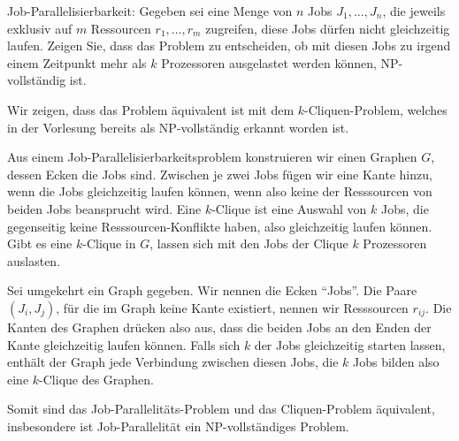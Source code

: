 Job-Parallelisierbarkeit:
Gegeben sei eine Menge von $n$ Jobs $J_1,\dots,J_n$, die jeweils exklusiv
auf $m$ Ressourcen $r_1,\dots,r_m$ zugreifen, diese Jobs dürfen
nicht gleichzeitig laufen. Zeigen Sie, dass das Problem zu entscheiden,
ob mit diesen Jobs zu irgend einem Zeitpunkt mehr als $k$ Prozessoren
ausgelastet werden können, NP-vollständig ist.


\begin{loesung}
Wir zeigen, dass das Problem äquivalent ist mit dem $k$-Cliquen-Problem,
welches in der Vorlesung bereits als NP-vollständig erkannt worden ist.

Aus einem Job-Parallelisierbarkeitsproblem konstruieren wir einen Graphen $G$,
dessen Ecken die Jobs sind. Zwischen je zwei Jobs fügen wir eine
Kante hinzu, wenn die Jobs gleichzeitig laufen können, wenn also
keine der Resssourcen von beiden Jobs beansprucht wird. Eine $k$-Clique
ist eine Auswahl von $k$ Jobs, die gegenseitig keine Resssourcen-Konflikte
haben, also gleichzeitig laufen können. Gibt es eine $k$-Clique in $G$,
lassen sich mit den Jobs der Clique $k$ Prozessoren auslasten.

Sei umgekehrt ein Graph gegeben. Wir nennen die Ecken ``Jobs''. Die
Paare $(J_i,J_j)$, für die im Graph keine Kante existiert,  nennen
wir Resssourcen $r_{ij}$. Die Kanten des Graphen drücken also aus, dass
die beiden Jobs an den Enden der Kante gleichzeitig laufen können.
Falls sich $k$ der Jobs gleichzeitig starten lassen, enthält der
Graph jede Verbindung zwischen diesen Jobs, die $k$ Jobs bilden also
eine $k$-Clique des Graphen.

Somit sind das Job-Parallelitäts-Problem und das Cliquen-Problem
äquivalent, insbesondere ist Job-Parallelität ein NP-vollständiges
Problem.
\end{loesung}
